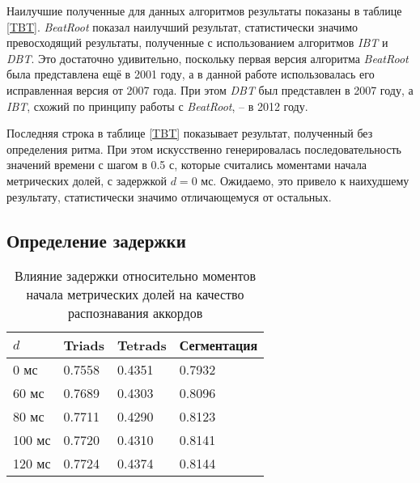 Наилучшие полученные для данных алгоритмов результаты показаны в таблице
\ref{TBT}. \emph{BeatRoot} показал наилучший результат, статистически значимо
превосходящий результаты, полученные с использованием алгоритмов \emph{IBT} и
\emph{DBT}. Это достаточно удивительно, поскольку первая версия алгоритма
\emph{BeatRoot} была представлена ещё в 2001 году, а в данной работе
использовалась его исправленная версия от 2007 года. При этом \emph{DBT} был
представлен в 2007 году, а \emph{IBT}, схожий по принципу работы с
\emph{BeatRoot}, -- в 2012 году. 

Последняя строка в таблице \ref{TBT} показывает результат, полученный без
определения ритма. При этом искусственно генерировалась последовательность
значений времени с шагом в 0.5 с, которые считались моментами начала метрических
долей, с задержкой $d=0$ мс. Ожидаемо, это привело к наихудшему результату,
статистически значимо отличающемуся от остальных.

\subsection{Определение задержки} \label{ssec3_offset}

\begin{table} [htbp]
  \centering
  \parbox{15cm}{\caption{Влияние задержки относительно моментов начала
  метрических долей на качество распознавания аккордов} \label{TDelay}}
  \begin{tabular}{|l|l|l|l|}
  \hline
  $d$ & Triads & Tetrads & Сегментация \\
  \hline
  0 мс & 0.7558 & 0.4351 & 0.7932 \\
  60 мс & 0.7689 & 0.4303 & 0.8096 \\
  80 мс & 0.7711 & 0.4290 & 0.8123 \\
  100 мс & 0.7720 & 0.4310 & 0.8141 \\
  120 мс & 0.7724 & 0.4374 & 0.8144 \\
  \hline
  \end{tabular}
\end{table}

